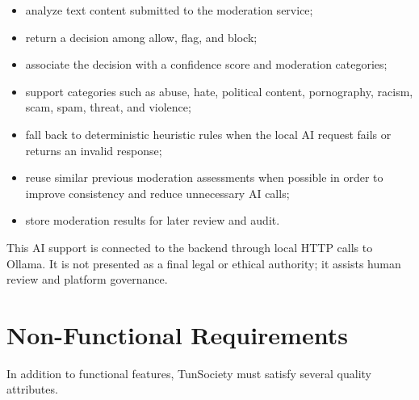\begin{itemize}
    \item analyze text content submitted to the moderation service;
    \item return a decision among allow, flag, and block;
    \item associate the decision with a confidence score and moderation categories;
    \item support categories such as abuse, hate, political content, pornography, racism, scam, spam, threat, and violence;
    \item fall back to deterministic heuristic rules when the local AI request fails or returns an invalid response;
    \item reuse similar previous moderation assessments when possible in order to improve consistency and reduce unnecessary AI calls;
    \item store moderation results for later review and audit.
\end{itemize}

This AI support is connected to the backend through local HTTP calls to Ollama. It is not presented as a final legal or ethical authority; it assists human review and platform governance.

\section{Non-Functional Requirements}

In addition to functional features, TunSociety must satisfy several quality attributes.

